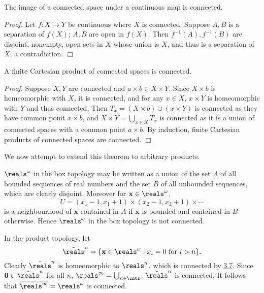\begin{theorem}\label{3.6}
    The image of a connected space under a continuous map is connected.
\end{theorem}
{\it Proof.} Let $f: X \rightarrow Y$ be continuous where $X$ is connected. Suppose $A, B$ is a separation of $f(X)$; $A, B$ are open in $f(X)$. Then $f^{-1}(A), f^{-1}(B)$ are disjoint, nonempty, open sets in $X$ whose union is $X$, and thus is a separation of $X$; a contradiction. $\Box$

\begin{theorem}\label{3.7}
    A finite Cartesian product of connected spaces is connected.
\end{theorem}
{\it Proof.} Suppose $X, Y$ are connected and $a \times b \in X \times Y$. Since $X \times b$ is homeomorphic with $X$, it is connected, and for any $x \in X$, $x \times Y$ is homeomorphic with $Y$ and thus connected. Then $T_x = (X \times b) \cup (x \times Y)$ is connected as they have common point $x \times b$, and $X \times Y = \bigcup_{x \in X} T_x$ is connected as it is a union of connected spaces with a common point $a \times b$. By induction, finite Cartesian products of connected spaces are connected. $\Box$

We now attempt to extend this theorem to arbitrary products.

$\reals^\omega$ in the box topology may be written as a union of the set $A$ of all bounded sequences of real numbers and the set $B$ of all unbounded sequences, which are clearly disjoint. Moreover for $\mathbf{x} \in \reals^\omega$, 
$$U = (x_1 - 1, x_1 + 1) \times (x_2-1, x_2+1) \times \cdots$$
is a neighbourhood of $\mathbf{x}$ contained in $A$ if $\mathbf{x}$ is bounded and contained in $B$ otherwise. Hence $\reals^\omega$ in the box topology is not connected.

In the product topology, let
$$\Tilde{\reals}^n = \{\mathbf{x} \in \reals^\omega: x_i = 0 \text{ for } i > n\}.$$
Clearly $\Tilde{\reals}^n$ is homeomorphic to $\reals^n$, which is connected by \hyperref[3.7]{3.7}. Since $\mathbf{0} \in \Tilde{\reals}^n$ for all $n$, $\reals^\infty = \bigcup_{n \in \ints^+} \Tilde{\reals}^n$ is connected. It follows that $\overline{\reals^\infty} = \reals^\omega$ is connected.

